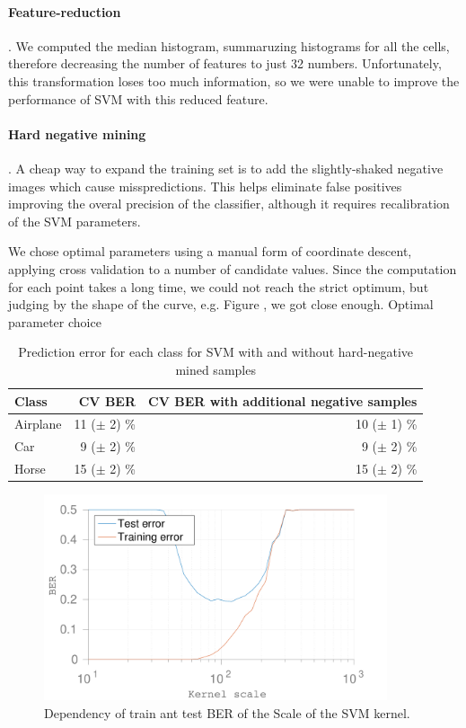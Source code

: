 \documentclass{article} %
\begin{document}
\paragraph{Feature-reduction}. We computed the median histogram, summaruzing histograms for all the cells, therefore decreasing the number of features to just 32 numbers. Unfortunately, this transformation loses too much information, so we were unable to improve the performance of SVM with this reduced feature.

\paragraph{Hard negative mining}. A cheap way to expand the training set is to add the slightly-shaked negative images which cause misspredictions. This helps eliminate false positives improving the overal precision of the classifier, although it requires recalibration of the SVM parameters.

We chose optimal parameters using a manual form of coordinate descent, applying cross validation to a number of candidate values. Since the computation for each point takes a long time, we could not reach the strict optimum, but judging by the shape of the curve, e.g. Figure \cite{fig:SVMKernelScaleBER}, we got close enough.
Optimal parameter choice

\begin{table}
  \centering
  \begin{tabular}{|l|r|r|}
    \hline
    Class & CV BER & CV BER with additional negative samples \\ \hline
    Airplane & 11 ($\pm$ 2) \% & 10 ($\pm$ 1) \% \\
    Car & 9 ($\pm$ 2) \% & 9 ($\pm$ 2) \% \\
    Horse & 15 ($\pm$ 2) \% & 15 ($\pm$ 2) \% \\
    \hline
  \end{tabular}
  \caption{Prediction error for each class for SVM with and without hard-negative mined samples}
  \label{tbl:SVMerr}
\end{table}


\begin{figure}[!t]
  \centering
  \includegraphics[width=0.9\textwidth]{figures/kernel_scale_ber.pdf}
  \caption{Dependency of train ant test BER of the Scale of the SVM kernel.}
  \label{fig:SVMKernelScaleBER}
\end{figure}
\end{document}
